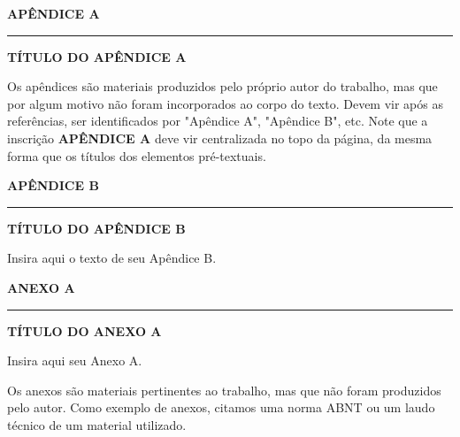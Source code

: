 \documentclass[a4paper,12pt]{report}%
\begin{document}
\newpage

%
%

%
%


\begin{center}
	{\bf {\normalsize APÊNDICE A} }
	\rule{14.75cm}{0.02cm} 
\end{center}
\vspace{0.3cm}
\begin{center}
	\textbf{\normalsize TÍTULO DO APÊNDICE A}
\end{center}

\vspace{0.5cm}
Os apêndices são materiais produzidos pelo próprio autor do trabalho, mas que por algum motivo não foram incorporados ao corpo do texto. Devem vir após as referências, ser identificados por "Apêndice A", "Apêndice B", etc. Note que a inscrição {\bf APÊNDICE A} deve vir centralizada no topo da página, da mesma forma que os títulos dos elementos pré-textuais. 


\newpage 

%
%


\begin{center}
	{\bf {\normalsize APÊNDICE B} }
	\rule{14.75cm}{0.02cm}
\end{center}
\vspace{0.3cm}
\begin{center}
	\textbf{\normalsize TÍTULO DO APÊNDICE B}
\end{center}

\hspace{0.5cm} 
Insira aqui o texto de seu Apêndice B.

\newpage 

%
%


\begin{center}
	{\bf {\normalsize ANEXO A} }
	\rule{14.75cm}{0.02cm} 
\end{center}
\vspace{0.3cm}
\begin{center}
	\textbf{\normalsize TÍTULO DO ANEXO A}
\end{center}

\vspace{0.5cm}
Insira aqui seu Anexo A.

\vspace{0.3cm}
Os anexos são materiais pertinentes ao trabalho, mas que não foram produzidos pelo autor. Como exemplo de anexos, citamos uma norma ABNT ou um laudo técnico de um material utilizado.


\newpage 
\end{document}
